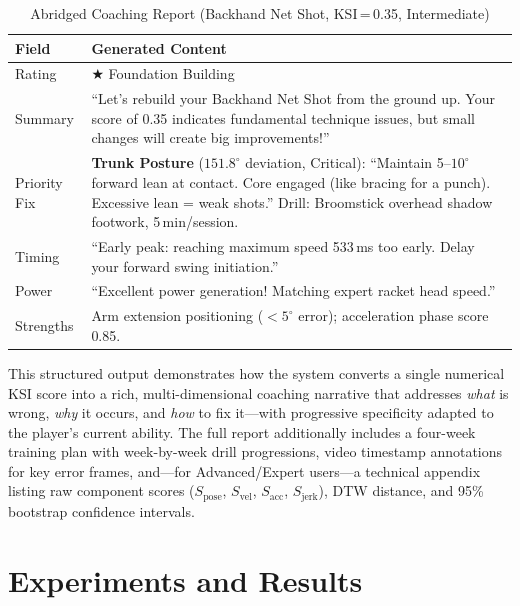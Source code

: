 \documentclass[pdflatex,sn-mathphys-num]{sn-jnl}
\theoremstyle{thmstyleone}%
\theoremstyle{thmstyletwo}%
\theoremstyle{thmstylethree}%
\begin{document}
\begin{table}[h]
\caption{Abridged Coaching Report (Backhand Net Shot, KSI\,=\,0.35, Intermediate)}\label{tab_coach_example}
\centering
\small
\setlength{\tabcolsep}{4pt}
\renewcommand{\arraystretch}{1.2}
\begin{tabular}{|l|p{10.5cm}|}
\hline
\textbf{Field} & \textbf{Generated Content} \\
\hline
Rating & $\bigstar$ Foundation Building \\
\hline
Summary & ``Let's rebuild your Backhand Net Shot from the ground up. Your score of 0.35 indicates fundamental technique issues, but small changes will create big improvements!'' \\
\hline
Priority Fix & \textbf{Trunk Posture} ($151.8^{\circ}$ deviation, Critical): ``Maintain 5--$10^{\circ}$ forward lean at contact. Core engaged (like bracing for a punch). Excessive lean = weak shots.'' Drill: Broomstick overhead shadow footwork, 5\,min/session. \\
\hline
Timing & ``Early peak: reaching maximum speed 533\,ms too early. Delay your forward swing initiation.'' \\
\hline
Power & ``Excellent power generation! Matching expert racket head speed.'' \\
\hline
Strengths & Arm extension positioning ($<5^{\circ}$ error); acceleration phase score 0.85. \\
\hline
\end{tabular}
\end{table}

This structured output demonstrates how the system converts a single numerical KSI score into a rich, multi-dimensional coaching narrative that addresses \textit{what} is wrong, \textit{why} it occurs, and \textit{how} to fix it---with progressive specificity adapted to the player's current ability. The full report additionally includes a four-week training plan with week-by-week drill progressions, video timestamp annotations for key error frames, and---for Advanced/Expert users---a technical appendix listing raw component scores ($S_{\text{pose}}$, $S_{\text{vel}}$, $S_{\text{acc}}$, $S_{\text{jerk}}$), DTW distance, and 95\% bootstrap confidence intervals.



\section{Experiments and Results}\label{sec5}
\end{document}

